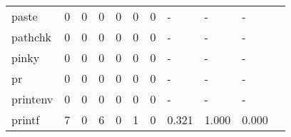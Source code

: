 \begin{longtable}{lp{1.2cm}p{1.2cm}p{1.2cm}p{1.2cm}p{1.2cm}p{1.2cm}p{1.2cm}p{1.2cm}p{1.2cm}p{1.2cm}}
paste     &                                     0 &                                                  0 &                                                0 &                                               0 &                                                0 &                                              0 &                                             - &                                                  - &                                                  - \\
pathchk   &                                     0 &                                                  0 &                                                0 &                                               0 &                                                0 &                                              0 &                                             - &                                                  - &                                                  - \\
pinky     &                                     0 &                                                  0 &                                                0 &                                               0 &                                                0 &                                              0 &                                             - &                                                  - &                                                  - \\
pr        &                                     0 &                                                  0 &                                                0 &                                               0 &                                                0 &                                              0 &                                             - &                                                  - &                                                  - \\
printenv  &                                     0 &                                                  0 &                                                0 &                                               0 &                                                0 &                                              0 &                                             - &                                                  - &                                                  - \\
printf    &                                     7 &                                                  0 &                                                6 &                                               0 &                                                1 &                                              0 &                                         0.321 &                                              1.000 &                                              0.000 \\

\end{longtable}
